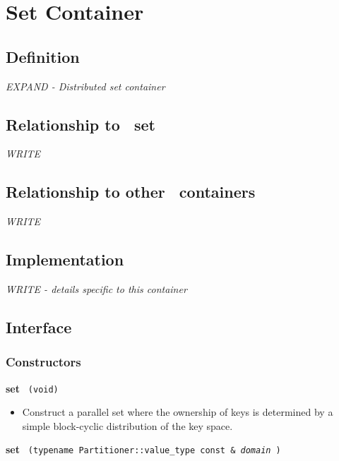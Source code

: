 
\section{ Set Container} \label{sec-set-cont}

\subsection{Definition}

\textit{EXPAND - Distributed set container}

\subsection{Relationship to \stl\ set}

\textit{WRITE}

\subsection{Relationship to other \stapl\ containers}

\textit{WRITE}

\subsection{Implementation}

\textit{WRITE - details specific to this container}

\subsection{Interface} \label{sec-set-cont-inter}

\subsubsection{Constructors}

\noindent
\textbf{set}%
\texttt{%
(void)
}

\begin{itemize}
\item
Construct a parallel set where the ownership of keys is determined by a simple block-cyclic distribution of the key space. 
\end{itemize}
 
\noindent
\textbf{set}%
\texttt{%
(typename Partitioner::value\_type const \&
\textit{domain}%
)
}

